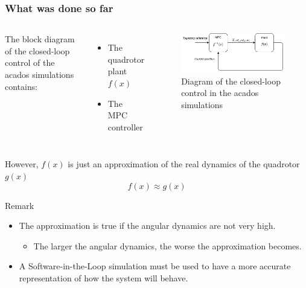 \documentclass{thesisbeamer}
\newcommand\Fontvi{\fontsize{9}{10}\selectfont}
\begin{document}
\begin{frame}
			\frametitle{What was done so far}
			\Fontvi
			\begin{columns}
			\column{0.5\textwidth}
			The block diagram of the closed-loop control of the acados simulations contains:
			\begin{itemize} %
				\item The quadrotor plant $f(x)$
				\item The MPC controller
			\end{itemize}
			\column{0.5\textwidth}
			\begin{figure}
				\centering
				\includegraphics[width=\textwidth]{diagrams/old_sim_diagram.png}
				\caption{Diagram of the closed-loop control in the acados simulations}
			\end{figure}
			 \end{columns}
			 However, $f(x)$ is just an approximation of the real dynamics of the quadrotor $g(x)$
			\begin{equation*}
				f(x) \approx g(x)
			\end{equation*}						 
			
			\begin{block}{Remark}
			\begin{itemize} %
				\item The approximation is true if the angular dynamics are not very high.
				\begin{itemize}
					\item \fontsize{9pt}{10pt}\selectfont The larger the angular dynamics, the worse the approximation becomes. 
				\end{itemize}
				
				\item A Software-in-the-Loop simulation must be used to have a more accurate representation of how the system will behave.
			\end{itemize}
			\end{block}
		\end{frame}
		
\end{document}

